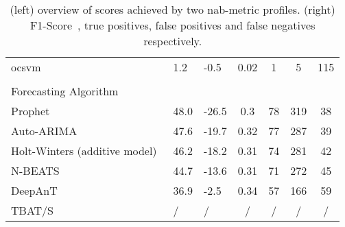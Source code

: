 \begin{table}[h]
{\begin{tabular}{lll|cccc}
            \acrshort{ocsvm}~\cite{Schölkopf.1999,Tax.2004}                 & 1.2               & -0.5              & 0.02    & 1     & 5     & 115   \\
            \\
            Forecasting Algorithm                                           &                   &                   &         &       &       &       \\\hline
            Prophet~\cite{Taylor.2017}                                      & 48.0              & -26.5             & 0.3     & 78    & 319   & 38    \\
            Auto-ARIMA~\cite{Smith.2017}                                    & 47.6              & -19.7             & 0.32    & 77    & 287   & 39    \\
            Holt-Winters (additive model)~\cite{Winters.1960}               & 46.2              & -18.2             & 0.31    & 74    & 281   & 42    \\
            N-BEATS~\cite{Oreshkin.2020}                                    & 44.7              & -13.6             & 0.31    & 71    & 272   & 45    \\
            DeepAnT~\cite{Munir.2019}                                       & 36.9              & -2.5              & 0.34    & 57    & 166   & 59    \\
            TBAT/S                                                          & /                 & /                 & /     & /     & /     & /     \\
        \end{tabular}
    }
    \caption[NAB-Scores achieved by the algorithms]{
    (left) overview of scores achieved by two \gls{nab}-metric profiles.
    (right) F1-Score~\cite[183]{Murphy.2012}, true positives, false positives
    and false negatives respectively.}\label{tab:results}
\end{table}

